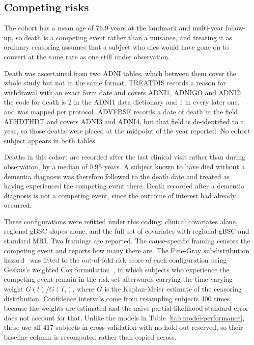 \documentclass[blue]{ludusofficial}  %
\begin{document}
\subsection{Competing risks}

The cohort has a mean age of 76.9 years at the landmark and multi-year follow-up, so death is a competing event rather than a nuisance, and treating it as ordinary censoring assumes that a subject who dies would have gone on to convert at the same rate as one still under observation.

Death was ascertained from two ADNI tables, which between them cover the whole study but not in the same format. TREATDIS records a reason for withdrawal with an exact form date and covers ADNI1, ADNIGO and ADNI2; the code for death is 2 in the ADNI1 data dictionary and 1 in every later one, and was mapped per protocol. ADVERSE records a date of death in the field AEHDTHDT and covers ADNI3 and ADNI4, but that field is de-identified to a year, so those deaths were placed at the midpoint of the year reported. No cohort subject appears in both tables.

Deaths in this cohort are recorded after the last clinical visit rather than during observation, by a median of 0.95 years. A subject known to have died without a dementia diagnosis was therefore followed to the death date and treated as having experienced the competing event there. Death recorded after a dementia diagnosis is not a competing event, since the outcome of interest had already occurred.

Three configurations were refitted under this coding: clinical covariates alone, regional gBSC slopes alone, and the full set of covariates with regional gBSC and standard MRI. Two framings are reported. The cause-specific framing censors the competing event and reports how many there are. The Fine-Gray subdistribution hazard~\cite{fine1999proportional} was fitted to the out-of-fold risk score of each configuration using Geskus's weighted Cox formulation~\cite{geskus2011cause}, in which subjects who experience the competing event remain in the risk set afterwards carrying the time-varying weight $G(t)/G(T_i)$, where $G$ is the Kaplan-Meier estimate of the censoring distribution. Confidence intervals come from resampling subjects 400 times, because the weights are estimated and the naive partial-likelihood standard error does not account for that. Unlike the models in Table~\ref{tab:model-performance}, these use all 417 subjects in cross-validation with no hold-out reserved, so their baseline column is recomputed rather than copied across.
\end{document}
